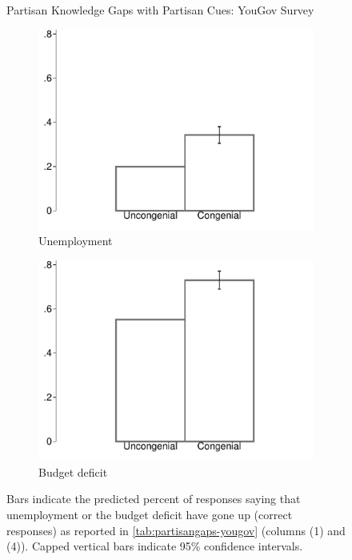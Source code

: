 \documentclass[12pt, letterpaper]{article}
\begin{document}
\begin{figure}[t]
	\caption{Partisan Knowledge Gaps with Partisan Cues: YouGov Survey}	
	\centering
	\begin{subfigure}{.495\textwidth}\centering
		\includegraphics[width=\textwidth]{../figs/yougov-unemp-congenialcue.pdf}
		\caption{Unemployment}
	\end{subfigure}
	\hfil
	\begin{subfigure}{.495\textwidth}\centering
		\includegraphics[width=\textwidth]{../figs/yougov-deficit-congenialcue.pdf}
		\caption{Budget deficit}
	\end{subfigure}	
	\caption*{\footnotesize Bars indicate the predicted percent of responses saying that unemployment or the budget deficit have gone up (correct responses) as reported in \cref{tab:partisangaps-yougov} (columns (1) and (4)).  
		Capped vertical bars indicate 95\% confidence intervals.
	}
	\label{fig:yougov-reg}
\end{figure}
\end{document}
